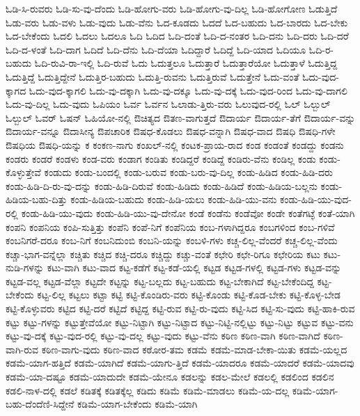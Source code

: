 {ಓಡಿ-ಸಿ-ರುವರು
ಓಡಿ-ಸು-ವು-ದೆಂದು
ಓಡಿ-ಹೋಗು-ವರು
ಓಡಿ-ಹೋಗು-ವು-ದಿಲ್ಲ
ಓಡಿ-ಹೋಗೋಣ
ಓಡುತ್ತಿದೆ
ಓಡು-ವರು
ಓಡು-ವಳು
ಓಡು-ವುದು
ಓಡು-ವೆನು
ಓದ-ಕೂಡದು
ಓದದೆ
ಓದ-ಬಹುದು
ಓದ-ಬಾರದು
ಓದ-ಬೇಕು
ಓದ-ಬೇಕೆಂದು
ಓದಲಿ
ಓದಲು
ಓದಲೂ
ಓದಿ
ಓದಿದ
ಓದಿ-ದಂತೆ
ಓದಿ-ದ-ನಂತರ
ಓದಿ-ದನು
ಓದಿ-ದರು
ಓದಿ-ದರೆ
ಓದಿ-ದ-ಳಂತೆ
ಓದಿ-ದಾಗ
ಓದಿದೆ
ಓದಿ-ದೆನು
ಓದಿ-ದೆಯಾ
ಓದಿದ್ದಾರೆ
ಓದಿದ್ದೆ
ಓದಿ-ಯಾದ
ಓದಿಯೂ
ಓದಿ-ರ-ಬಹುದು
ಓದಿ-ರುವಿ-ರಾ-ಇಲ್ಲಿ
ಓದಿ-ರುವೆ
ಓದು
ಓದುತ್ತಲೂ
ಓದುತ್ತಾರೆ
ಓದುತ್ತಾರೆಯೋ
ಓದುತ್ತಾಳೆ
ಓದುತ್ತಿದ್ದ
ಓದುತ್ತಿದ್ದೆ
ಓದುತ್ತಿದ್ದೇನೆ
ಓದುತ್ತಿರ-ಬಹುದು
ಓದುತ್ತಿ-ರುವನು
ಓದುತ್ತಿರುವೆ
ಓದುತ್ತೇನೆ
ಓದು-ವಂತೆ
ಓದು-ವುದ-ಕ್ಕಾಗದ
ಓದು-ವುದ-ಕ್ಕಾಗಲಿ
ಓದು-ವು-ದಕ್ಕಾಗಿ
ಓದು-ವು-ದಕ್ಕೂ
ಓದು-ವು-ದಕ್ಕೆ
ಓದು-ವುದ-ರಿಂದ
ಓದು-ವು-ದಾಗಲಿ
ಓದು-ವು-ದಿಲ್ಲ
ಓದು-ವುದು
ಓಪಿಯಂ
ಓರ್ವ
ಓರ್ವನ
ಓಲಾಡು-ತ್ತಿರು-ವರು
ಓಲುವುದ-ರಲ್ಲಿ
ಓಲ್
ಓಲ್ಬುಲ್
ಓಲ್ಬುಲ್
ಓವರ್
ಓಷನ್
ಓಹಿಯೋ-ನಲ್ಲಿ
ಔಚಿತ್ಯದ
ಔತಣ-ವಾಗುತ್ತದೆ
ಔದಾರ್ಯ
ಔದಾರ್ಯ-ತೆಗೆ
ಔದಾರ್ಯ-ವನ್ನು
ಔದಾರ್ಯ-ವನ್ನೂ
ಔದಾಸೀನ್ಯ
ಔಪಚಾರಿಕ
ಔಷಧ-ಕೊಡಲು
ಔಷಧ-ವನ್ನಾಗಿ
ಔಷಧ-ವಾದ
ಔಷಧಿ
ಔಷಧಿ-ಗಳೇ
ಔಷಧಿಯ
ಔಷಧಿ-ಯನ್ನು
ಕ
ಕಂಕಣ-ನಾಗು
ಕಂಖಲ್-ನಲ್ಲಿ
ಕಂಟಕ-ಪ್ರಾಯ-ರಾದ
ಕಂಡ
ಕಂಡಂತೆ
ಕಂಡದ್ದು
ಕಂಡನು
ಕಂಡರು
ಕಂಡರೆ
ಕಂಡಳು
ಕಂಡ-ವರು
ಕಂಡಾಗ
ಕಂಡಿತು
ಕಂಡಿದ್ದರೆ
ಕಂಡಿದ್ದೆ
ಕಂಡಿರು-ವೆನು
ಕಂಡಿಲ್ಲ
ಕಂಡು
ಕಂಡು-ಕೊಳ್ಳುತ್ತೇವೆ
ಕಂಡುದು
ಕಂಡು-ಬಂದಲ್ಲಿ
ಕಂಡು-ಬರುವ
ಕಂಡು-ಬರು-ವು-ದಿಲ್ಲ
ಕಂಡು-ಹಿಡಿದ
ಕಂಡು-ಹಿಡಿ-ದರು
ಕಂಡು-ಹಿಡಿ-ದಿ-ರು-ವು-ದನ್ನು
ಕಂಡು-ಹಿಡಿ-ದಿರುವೆ
ಕಂಡು-ಹಿಡಿದು
ಕಂಡು-ಹಿಡಿದೆ
ಕಂಡು-ಹಿಡಿಯ-ಬಲ್ಲನು
ಕಂಡು-ಹಿಡಿಯ-ಬಹು-ದಿತ್ತು
ಕಂಡು-ಹಿಡಿಯ-ಬಹುದು
ಕಂಡು-ಹಿಡಿ-ಯಲು
ಕಂಡು-ಹಿಡಿ-ಯು-ವನು
ಕಂಡು-ಹಿಡಿ-ಯು-ವುದ-ರಲ್ಲಿ
ಕಂಡು-ಹಿಡಿ-ಯು-ವುದು
ಕಂಡು-ಹಿಡಿ-ಯು-ವು-ದೇನೋ
ಕಂಡೆ
ಕಂಡೆನು
ಕಂಡೆವೋ
ಕಂಡೇ
ಕಂತೆಗಟ್ಳೆ
ಕಂತೆ-ಯಾಗಿ
ಕಂಪನಿ
ಕಂಪನಿಯ
ಕಂಪಿ-ಸುತ್ತಿತ್ತು
ಕಂಪೆನಿ
ಕಂಪೆ-ನಿಗೆ
ಕಂಪೆನಿಯ
ಕಂಬ-ಗಳಾಗಿದ್ದರೂ
ಕಂಬಗಳಿಂದ
ಕಂಬ-ಗಳಿವೆ
ಕಂಬನಿಗರೆ-ದರೂ
ಕಂಬ-ನಿಗೆ
ಕಂಬನಿದುಂಬಿ
ಕಂಬನಿ-ಯನ್ನು
ಕಂಬಳಿ-ಗಳು
ಕಚ್ಚ-ಲಿಲ್ಲ-ವೆಂದರೆ
ಕಚ್ಚ-ಲಿಲ್ಲ-ವೆಂದು
ಕಚ್ಚಾ-ಭಾಗ-ವನ್ನೆಲ್ಲಾ
ಕಚ್ಚಿತು
ಕಚ್ಚಿದ
ಕಚ್ಚಿ-ದರೂ
ಕಚ್ಚಿದ್ದು
ಕಚ್ಚು-ವಂತೆ
ಕಛೇರಿ
ಕಛೇ-ರಿಗೂ
ಕಛೇರಿಯ
ಕಟು
ಕಟು-ನುಡಿ-ಗಳನ್ನು
ಕಟು-ವಾಗಿ
ಕಟು-ವಾದ
ಕಟ್ಟ-ಕಡೆಗೆ
ಕಟ್ಟ-ಕಡೆ-ಯಲ್ಲಿ
ಕಟ್ಟಡ
ಕಟ್ಟಡ-ಗಳಲ್ಲಿ
ಕಟ್ಟಡ-ಗಳು
ಕಟ್ಟಡ-ವನ್ನು
ಕಟ್ಟಡ-ವಲ್ಲ
ಕಟ್ಟಡ-ವೆಲ್ಲಾ
ಕಟ್ಟದೇ
ಕಟ್ಟನ್ನು
ಕಟ್ಟ-ಬಲ್ಲದು
ಕಟ್ಟ-ಬಹುದು
ಕಟ್ಟ-ಬೇಕಾಗಿದೆ
ಕಟ್ಟ-ಬೇಕೆಂದಿದ್ದ
ಕಟ್ಟ-ಬೇಕೆಂದು
ಕಟ್ಟ-ಲಿಲ್ಲ
ಕಟ್ಟಲು
ಕಟ್ಟಾ
ಕಟ್ಟಿ
ಕಟ್ಟಿ-ಕೊಂಡಿರು-ವರು
ಕಟ್ಟಿ-ಕೊಂಡು
ಕಟ್ಟಿ-ಕೊಡ-ಬೇಕು
ಕಟ್ಟಿ-ಕೊಳ್ಳ-ಬೇಡ
ಕಟ್ಟಿ-ಕೊಳ್ಳುವರು
ಕಟ್ಟಿದ
ಕಟ್ಟಿ-ದರೆ
ಕಟ್ಟಿದೆ
ಕಟ್ಟಿದ್ದ
ಕಟ್ಟಿ-ರುವ
ಕಟ್ಟಿ-ರು-ವುದು
ಕಟ್ಟಿ-ಸಿದ
ಕಟ್ಟಿ-ಸು-ವುದು
ಕಟ್ಟಿ-ಹಾಕಿ-ರುವ
ಕಟ್ಟು
ಕಟ್ಟು-ಗಳನ್ನು
ಕಟ್ಟುತ್ತೇವೆಯೋ
ಕಟ್ಟು-ನಿಟ್ಟಾಗಿ
ಕಟ್ಟು-ನಿಟ್ಟಾದ
ಕಟ್ಟು-ನಿಟ್ಟಿ-ನಲ್ಲಿಟ್ಟು
ಕಟ್ಟು-ನಿಟ್ಟು
ಕಟ್ಟುವ
ಕಟ್ಟು-ವನು
ಕಟ್ಟು-ವು-ದಕ್ಕೆ
ಕಟ್ಟು-ವುದ-ರಲ್ಲಿ
ಕಟ್ಟು-ವು-ದಲ್ಲ
ಕಟ್ಟು-ವುದು
ಕಟ್ಟು-ವೆನು
ಕಠಿಣ
ಕಠಿಣ-ವಾಗಿ
ಕಠಿಣ-ವಾಗಿದೆ
ಕಠಿಣ-ವಾಗಿ-ರುವ
ಕಠಿಣ-ವಾಗು-ವುದು
ಕಠಿಣ-ವಾದ
ಕಠೋರ-ತಮ
ಕಡಮೆ
ಕಡಮೆ-ಮಾಡ-ಬೇಕಾ-ಯಿತು
ಕಡಮೆ-ಯಲ್ಲದ
ಕಡಮೆ-ಯಾಗ-ಹತ್ತಿದೆ
ಕಡಮೆ-ಯಾಗಿದೆ
ಕಡಮೆ-ಯಾಗು-ತ್ತಿದೆ
ಕಡಮೆ-ಯಾದರೂ
ಕಡಮೆ-ಯಾದರೆ
ಕಡಮೆ-ಯಾದವು
ಕಡಮೆ-ಯಾ-ದಷ್ಟೂ
ಕಡಮೆ-ಯಾದುದೇ
ಕಡಮೆ-ಯೇನೂ
ಕಡಲನ್ನು
ಕಡಲ-ಮೇಲೆ
ಕಡಲಲ್ಲಿ
ಕಡಲಿಂದ
ಕಡಲಿನ
ಕಡಲಿ-ನಾಳ-ದಲ್ಲಿ
ಕಡಲೆ
ಕಡಿತಕ್ಕೆ
ಕಡಿತಕ್ಕೆಲ್ಲ
ಕಡಿದು
ಕಡಿಮೆ
ಕಡಿಮೆ-ಮಾಡಲು
ಕಡಿಮೆ-ಯ-ದಲ್ಲ
ಕಡಿಮೆ-ಯಾಗ-ಬಹು-ದೆಂದೆಣಿ-ಸಿದ್ದೇನೆ
ಕಡಿಮೆ-ಯಾಗ-ಬೇಕೆಂದು
ಕಡಿಮೆ-ಯಾಗಿ
}
